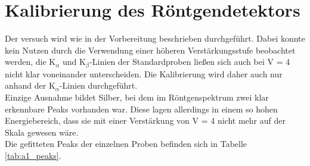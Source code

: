 


\section{Kalibrierung des R\"ontgendetektors}

Der versuch wird wie in der Vorbereitung beschrieben durchgef\"uhrt.
Dabei konnte kein Nutzen durch die Verwendung einer h\"oheren Verst\"arkungsstufe beobachtet werden, die K$_\alpha$ und K$_\beta$-Linien der Standardproben lie\ss en sich auch bei V = 4 nicht klar voneinander unterscheiden. Die Kalibrierung wird daher auch nur anhand der K$_\alpha$-Linien durchgef\"uhrt.\\
Einzige Ausnahme bildet Silber, bei dem im R\"ontgenspektrum zwei klar erkennbare Peaks vorhanden war. Diese lagen allerdings in einem so hohen Energiebereich, dass sie mit einer Verst\"arkung von V = 4 nicht mehr auf der Skala gewesen w\"are.\\
Die gefitteten Peaks der einzelnen Proben befinden sich in Tabelle \ref{tab:a1_peaks}.

\xtable

